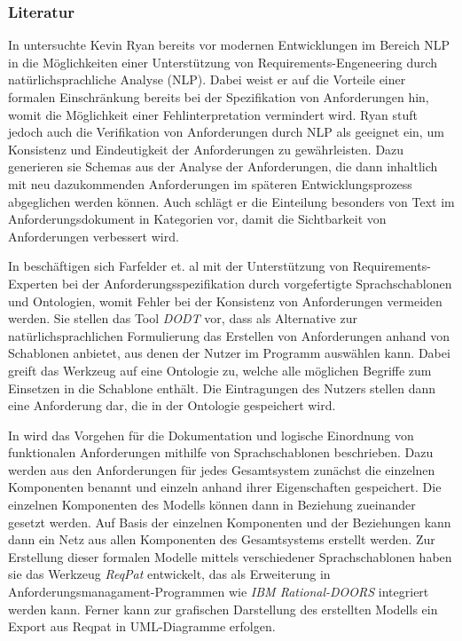 \documentclass[12pt]{report}
\begin{document}
\subsubsection{Literatur}
In \cite{kr93} untersuchte Kevin Ryan bereits vor modernen Entwicklungen im Bereich NLP in die Möglichkeiten einer Unterstützung von Requirements-Engeneering durch natürlichsprachliche Analyse (NLP). Dabei weist er auf die Vorteile einer formalen Einschränkung bereits bei der Spezifikation von Anforderungen hin, womit die Möglichkeit einer Fehlinterpretation vermindert wird. Ryan stuft jedoch auch die Verifikation von Anforderungen durch NLP als geeignet ein, um Konsistenz und Eindeutigkeit der Anforderungen zu gewährleisten. Dazu generieren sie Schemas aus der Analyse der Anforderungen, die dann inhaltlich mit neu dazukommenden Anforderungen im späteren Entwicklungsprozess abgeglichen werden können. Auch schlägt er die Einteilung besonders von Text im Anforderungsdokument in Kategorien vor, damit die Sichtbarkeit von Anforderungen verbessert wird.

\vspace{12pt}

In \cite{sf11} beschäftigen sich Farfelder et. al mit der Unterstützung von Requirements-Experten bei der Anforderungsspezifikation durch vorgefertigte Sprachschablonen und Ontologien, womit Fehler bei der Konsistenz von Anforderungen vermeiden werden. Sie stellen das Tool \textit{DODT} vor, dass als Alternative zur natürlichsprachlichen Formulierung das Erstellen von Anforderungen anhand von Schablonen anbietet, aus denen der Nutzer im Programm auswählen kann. Dabei greift das Werkzeug auf eine Ontologie zu, welche alle möglichen Begriffe zum Einsetzen in die Schablone enthält. Die Eintragungen des Nutzers stellen dann eine Anforderung dar, die in der Ontologie gespeichert wird.

\vspace{12pt}

In \cite{fh14} wird das Vorgehen für die Dokumentation und logische Einordnung von funktionalen Anforderungen mithilfe von Sprachschablonen beschrieben. Dazu werden aus den Anforderungen für jedes Gesamtsystem zunächst die einzelnen Komponenten benannt und einzeln anhand ihrer Eigenschaften gespeichert. Die einzelnen Komponenten des Modells können dann in Beziehung zueinander gesetzt werden. Auf Basis der einzelnen Komponenten und der Beziehungen kann dann ein Netz aus allen Komponenten des Gesamtsystems erstellt werden. Zur Erstellung dieser formalen Modelle mittels verschiedener Sprachschablonen haben sie das Werkzeug \textit{ReqPat} entwickelt, das als Erweiterung in Anforderungsmanagament-Programmen wie \textit{IBM Rational-DOORS} integriert werden kann. Ferner kann zur grafischen Darstellung des erstellten Modells ein Export aus Reqpat in UML-Diagramme erfolgen.
\end{document}

